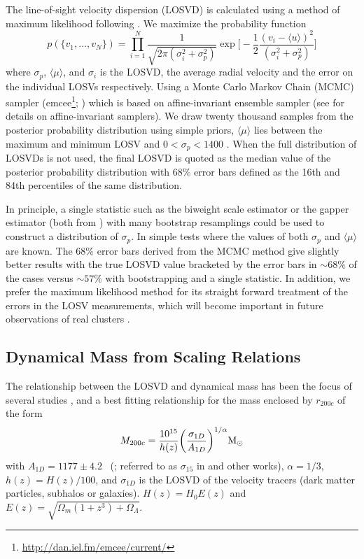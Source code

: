 \documentclass[fleqn,usenatbib]{mnras}
\begin{document}
The line-of-sight velocity dispersion (LOSVD) is calculated using a method of maximum likelihood following \cite{Walker2006}. We maximize the probability function 
\begin{equation}\label{eq: jointGaussian}
p(\{v_1, ..., v_N\})=\displaystyle\prod_{i=1}^{N}\frac{1}{\sqrt{2\pi(\sigma_i^2+\sigma_p^2)}}\exp\biggl[-\frac{1}{2}\frac{(v_i-\langle u \rangle)^2}{(\sigma_i^2+\sigma_p^2)}\biggr]
\end{equation}
where $\sigma_p$, $\langle\mu\rangle$, and $\sigma_i$ is the LOSVD, the average radial velocity and the error on the individual LOSVs respectively. Using a Monte Carlo Markov Chain (MCMC) sampler ({\sc emcee}\footnote{\url{http://dan.iel.fm/emcee/current/}}; \citealt{Foreman-Mackey2013}) which is based on affine-invariant ensemble sampler (see \citealt{Goodman2010} for details on affine-invariant samplers). We draw twenty thousand samples from the posterior probability distribution using simple priors, $\langle\mu\rangle$ lies between the maximum and minimum LOSV and $0< \sigma_p < 1400$ \kms. When the full distribution of LOSVDs is not used, the final LOSVD is quoted as the median value of the posterior probability distribution with 68\% error bars defined as the 16th and 84th percentiles of the same distribution.

In principle, a single statistic such as the biweight scale estimator or the gapper estimator (both from \citealt{Beers1990}) with many bootstrap resamplings could be used to construct a distribution of $\sigma_p$. In simple tests where the values of both $\sigma_p$ and $\langle\mu\rangle$ are known. The 68\% error bars derived from the MCMC method give slightly better results with the true LOSVD value bracketed by the error bars in $\sim68\%$ of the cases versus $\sim57\%$ with bootstrapping and a single statistic. In addition, we prefer the maximum likelihood method for its straight forward treatment of the errors in the LOSV measurements, which will become important in future observations of real clusters .

\subsection{Dynamical Mass from Scaling Relations}\label{sec: mass}
The relationship between the LOSVD and dynamical mass has been the focus of several studies , and a best fitting relationship for the mass enclosed by $r_{200c}$ of the form
\begin{equation}\label{eq:power law}
	M_{200c} = \frac{10^{15}}{h(z)} \bigg{(}\frac{\sigma_{1D}}{A_{1D}} \bigg{)}^{1/\alpha} \hbox{$\mathrm{M}_\odot$}
\end{equation}
with $A_{1D} = 1177 \pm 4.2$ \kms\ (\citealt{Munari2013}; referred to as $\sigma_{15}$ in \citealt{Evrard2008} and other works), $\alpha = 1/3$, $h(z) = H(z)/100$, and $\sigma_{1D}$ is the LOSVD of the velocity tracers (dark matter particles, subhalos or galaxies). $H(z) = H_0 E(z)$ and $E(z) = \sqrt{\Omega_m(1+z^3)+\Omega_{\Lambda}}$.
\end{document}
